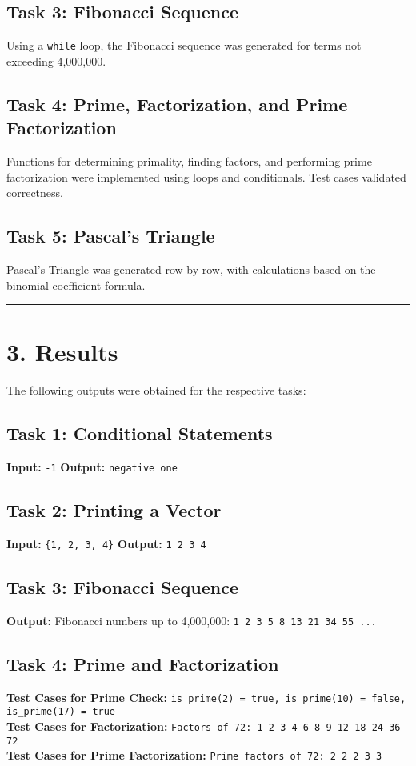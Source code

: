 \documentclass[12pt]{article}
\begin{document}
\subsection*{Task 3: Fibonacci Sequence}
Using a \texttt{while} loop, the Fibonacci sequence was generated for terms not exceeding 4,000,000.

\subsection*{Task 4: Prime, Factorization, and Prime Factorization}
Functions for determining primality, finding factors, and performing prime factorization were implemented using loops and conditionals. Test cases validated correctness.

\subsection*{Task 5: Pascal's Triangle}
Pascal's Triangle was generated row by row, with calculations based on the binomial coefficient formula.
\vspace{6pt}
\hrule
\section*{3. Results}

The following outputs were obtained for the respective tasks:

\subsection*{Task 1: Conditional Statements}
\textbf{Input:} \texttt{-1} \newline
\textbf{Output:} \texttt{negative one}

\subsection*{Task 2: Printing a Vector}
\textbf{Input:} \texttt{\{1, 2, 3, 4\}} \newline
\textbf{Output:} \texttt{1 2 3 4}

\subsection*{Task 3: Fibonacci Sequence}
\textbf{Output:} Fibonacci numbers up to 4,000,000: \newline
\texttt{1 2 3 5 8 13 21 34 55 ...}

\subsection*{Task 4: Prime and Factorization}
\textbf{Test Cases for Prime Check:} \newline
\texttt{is\_prime(2) = true, is\_prime(10) = false, is\_prime(17) = true} \\[8pt]
\textbf{Test Cases for Factorization:} \newline
\texttt{Factors of 72: 1 2 3 4 6 8 9 12 18 24 36 72} \\[8pt]
\textbf{Test Cases for Prime Factorization:} \newline
\texttt{Prime factors of 72: 2 2 2 3 3}
\end{document}

